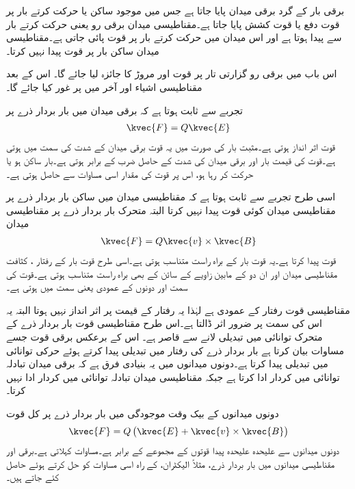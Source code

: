 برقی بار کے گرد برقی میدان پایا جاتا ہے جس میں موجود ساکن یا حرکت کرتے بار پر قوت دفع یا قوت کشش پایا جاتا ہے۔مقناطیسی میدان برقی رو یعنی حرکت کرتے بار سے پیدا ہوتا ہے اور اس میدان میں حرکت کرتے بار پر قوت پائی جاتی ہے۔مقناطیسی میدان ساکن بار پر قوت پیدا نہیں کرتا۔

اس باب میں برقی رو گزارتی تار پر قوت اور مروڑ  کا جائزہ لیا جائے گا۔ اس کے بعد مقناطیسی اشیاء اور آخر میں پر غور کیا جائے گا۔

تجربے سے  ثابت ہوتا ہے کہ برقی میدان میں بار بردار ذرے  پر 
\begin{align}\label{مساوات_امالہ_برقی_قوت}
\kvec{F}=Q \kvec{E}
\end{align}
قوت اثر انداز ہوتی ہے۔مثبت بار کی صورت میں یہ قوت برقی میدان کے شدت  کی سمت میں ہوتی ہے۔قوت کی قیمت بار  اور برقی میدان کی شدت  کے حاصل ضرب کے برابر ہوتی ہے۔بار ساکن ہو یا حرکت کر رہا ہو، اس پر قوت کی مقدار اسی مساوات سے حاصل ہوتی ہے۔

اسی طرح تجربے سے ثابت ہوتا ہے کہ مقناطیسی میدان میں ساکن بار بردار ذرے  پر مقناطیسی میدان کوئی قوت پیدا نہیں کرتا البتہ متحرک بار بردار ذرے  پر مقناطیسی میدان
\begin{align}\label{مساوات_امالہ_مقناطیسی_قوت}
\kvec{F}=Q \kvec{v} \times \kvec{B} 
\end{align}
قوت پیدا کرتا ہے۔یہ قوت بار  کے براہ راست متناسب ہوتی ہے۔اسی طرح قوت بار کے رفتار ،  کثافت مقناطیسی میدان  اور ان دو کے مابین زاویے کے سائن کے بھی براہ راست متناسب ہوتی ہے۔قوت کی سمت  اور  دونوں کے عمودی یعنی  سمت میں ہوتی ہے۔

مقناطیسی قوت رفتار کے عمودی ہے لہٰذا یہ رفتار کے قیمت پر اثر انداز نہیں ہوتا البتہ یہ اس کی سمت پر ضرور اثر ڈالتا ہے۔اس طرح مقناطیسی قوت بار بردار ذرے کے متحرک توانائی میں تبدیلی لانے سے قاصر ہے۔ اس کے برعکس برقی قوت جسے مساوات  بیان کرتا ہے بار بردار ذرے کی رفتار میں تبدیلی پیدا کرتے ہوئے حرکی توانائی میں تبدیلی پیدا کرتا ہے۔دونوں میدانوں میں یہ بنیادی فرق ہے کہ برقی میدان تبادلہ توانائی میں کردار ادا کرتا ہے جبکہ مقناطیسی میدان تبادلہ توانائی میں کردار ادا نہیں کرتا۔

دونوں میدانوں کے بیک وقت موجودگی میں بار بردار ذرے پر کل قوت
\begin{align}\label{مساوات_امالہ_لورنز}
\kvec{F}=Q\left(\kvec{E}+\kvec{v} \times \kvec{B} \right)
\end{align}
دونوں میدانوں سے علیحدہ علیحدہ پیدا قوتوں کے مجموعے کے برابر ہے۔مساوات   کہلاتی ہے۔برقی اور مقناطیسی میدانوں میں بار بردار ذرے، مثلاً الیکٹران، کے راہ اسی مساوات کو حل کرتے ہوئے حاصل کئے جاتے ہیں۔

